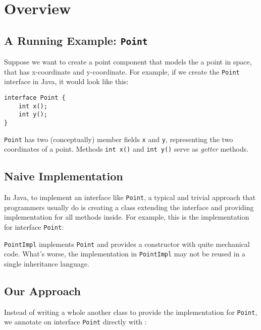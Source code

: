 \section{Overview}\label{sec:ep}

\subsection{A Running Example: \texttt{Point}}
Suppose we want to create a point component that models the a point in space,
that has x-coordinate and y-coordinate. For example, if we create the
\texttt{Point} interface in Java, it would look like this:

\begin{lstlisting}
interface Point {
    int x();
    int y(); 
}
\end{lstlisting}

\texttt{Point} has two (conceptually) member fields \texttt{x} and \texttt{y},
representing the two coordinates of a point. Methods \texttt{int x()} and
\texttt{int y()} serve as \emph{getter} methods. 

\subsection{Naive Implementation}
In Java, to implement an interface like \texttt{Point}, a typical and trivial
approach that programmers usually do is creating a class extending the interface
and providing implementation for all methods inside. For example, this is the
implementation for interface \texttt{Point}:


\texttt{PointImpl} implements \texttt{Point} and provides a constructor with
quite mechanical code. What's worse, the implementation in \texttt{PointImpl}
may not be reused in a single inheritance language.

\subsection{Our Approach}
Instead of writing a whole another class to provide the implementation for
\texttt{Point}, we annotate on interface \texttt{Point} directly with \mixin:

